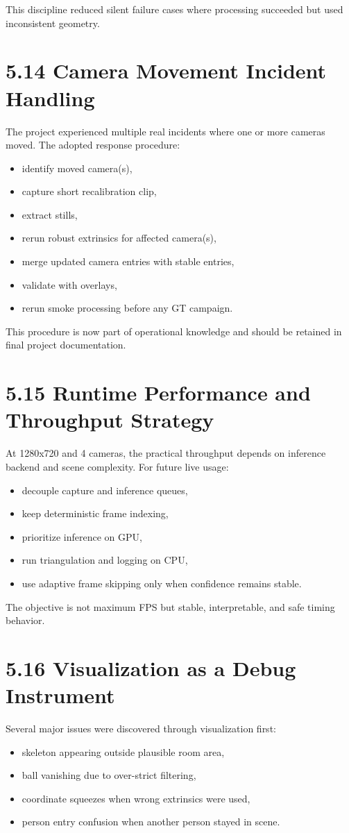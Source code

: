 This discipline reduced silent failure cases where processing succeeded but used inconsistent geometry.

\section{5.14 Camera Movement Incident Handling}
The project experienced multiple real incidents where one or more cameras moved. The adopted response procedure:
\begin{itemize}
  \item identify moved camera(s),
  \item capture short recalibration clip,
  \item extract stills,
  \item rerun robust extrinsics for affected camera(s),
  \item merge updated camera entries with stable entries,
  \item validate with overlays,
  \item rerun smoke processing before any GT campaign.
\end{itemize}

This procedure is now part of operational knowledge and should be retained in final project documentation.

\section{5.15 Runtime Performance and Throughput Strategy}
At 1280x720 and 4 cameras, the practical throughput depends on inference backend and scene complexity. For future live usage:
\begin{itemize}
  \item decouple capture and inference queues,
  \item keep deterministic frame indexing,
  \item prioritize inference on GPU,
  \item run triangulation and logging on CPU,
  \item use adaptive frame skipping only when confidence remains stable.
\end{itemize}

The objective is not maximum FPS but stable, interpretable, and safe timing behavior.

\section{5.16 Visualization as a Debug Instrument}
Several major issues were discovered through visualization first:
\begin{itemize}
  \item skeleton appearing outside plausible room area,
  \item ball vanishing due to over-strict filtering,
  \item coordinate squeezes when wrong extrinsics were used,
  \item person entry confusion when another person stayed in scene.
\end{itemize}

